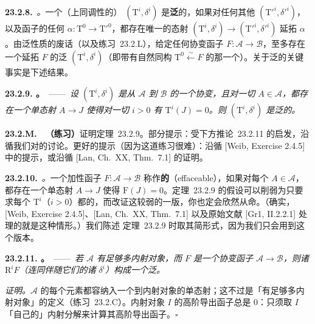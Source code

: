 \textbf{23.2.8.}\ \emph{\trhDefinition。}\quad 一个（上同调性的）\trDeltaFunctor{} $(\mathrm{T}^i,\delta^i)$ 是\textbf{泛}的，如果对任何其他\trDeltaFunctor{} $(\mathrm{T}'^i,\delta'^i)$，以及函子的任何\trNaturalTransformation{} $\alpha\colon\mathrm{T}^0\to\mathrm{T}'^0$，都存在唯一的\trDeltaFunctor{}态射 $(\mathrm{T}^i,\delta^i)\to(\mathrm{T}'^i,\delta'^i)$ 延拓 $\alpha$。由泛性质的废话（以及\mbox{练习~23.2.L}），给定任何协变\trLeftExact{}函子 $F\colon\mathscr{A}\to\mathscr{B}$，至多存在一个延拓 $F$ 的泛\trDeltaFunctor{} $(\mathrm{T}^i,\delta^i)$（即带有自然同构 $\mathrm{T}^0\overset{\sim}{\longleftarrow}F$ 的那一个）。关于泛\trDeltaFunctor{}的关键事实是下述结果。

\textbf{23.2.9. \trhTheorem。}\ ——\ \emph{设 $(\mathrm{T}^i,\delta^i)$ 是从 $\mathscr{A}$ 到 $\mathscr{B}$ 的一个协变\trDeltaFunctor，且对一切 $A\in\mathscr{A}$，都存在一个单态射 $A\to J$ 使得对一切 $i>0$ 有 $\mathrm{T}^i(J)=0$。则 $(\mathrm{T}^i,\delta^i)$ 是泛的。}

\textbf{23.2.M.}\ \extrahard\ \textbf{（练习）}\quad 证明\mbox{定理~23.2.9}。部分提示：受下方\mbox{推论~23.2.11} 的启发，沿循我们对\trDerivedFunctor{}的讨论。更好的提示（因为这道练习很难）：沿循 [Weib, Exercise 2.4.5] 中的提示，或沿循 [Lan, Ch.~XX, Thm.~7.1] 的证明。

\textbf{23.2.10.}\ \emph{\trhRemark。}\quad 一个加性函子 $F\colon\mathscr{A}\to\mathscr{B}$ 称作\textbf{\trEffaceable{}的}（effaceable），如果对每个 $A\in\mathscr{A}$，都存在一个单态射 $A\to J$ 使得 $\mathrm{F}(J)=0$。\mbox{定理~23.2.9} 的假设可以削弱为只要求每个 $\mathrm{T}^i$（$i>0$）都\trEffaceable{}的，而改证这较弱的一版，你也定会欣然从命。（确实，[Weib, Exercise 2.4.5]、[Lan, Ch.~XX, Thm.~7.1] 以及原始文献 [Gr1, II.2.2.1] 处理的就是这种情形。）我们陈述 \mbox{定理~23.2.9} 时取其简形式，因为我们只会用到这个版本。

\textbf{23.2.11. \trhCorollary。}\ ——\ \emph{若 $\mathscr{A}$ 有足够多内射对象，而 $F$ 是一个协变\trLeftExact{}函子 $\mathscr{A}\to\mathscr{B}$，则诸 $\mathrm{R}^iF$（连同伴随它们的诸 $\delta^i$）构成一个泛\trDeltaFunctor。}

\emph{证明。}\quad $\mathscr{A}$ 的每个元素都容纳入一个到内射对象的单态射；这不过是「有足够多内射对象」的定义（\mbox{练习~23.2.C}）。内射对象 $I$ 的高阶导出函子总是 $0$：只须取 $I$ 「自己的」内射分解来计算其高阶导出函子。\hfill$\square$

